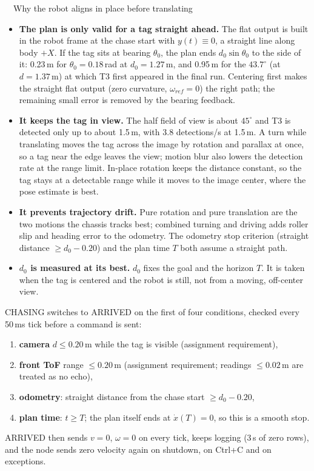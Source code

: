 \begin{keybox}{\faCompass\ \ Why the robot aligns in place before translating}
\small
\begin{itemize}
  \item \textbf{The plan is only valid for a tag straight ahead.} The flat output is built in the robot frame at the
        chase start with $y(t)\equiv0$, a straight line along body $+X$. If the tag sits at bearing $\theta_0$, the
        plan ends $d_0\sin\theta_0$ to the side of it: 0.23\,m for $\theta_0=0.18$\,rad at $d_0=1.27$\,m, and
        0.95\,m for the $43.7^\circ$ (at $d=1.37$\,m) at which T3 first appeared in the final run. Centering first makes the straight
        flat output (zero curvature, $\omega_{ref}=0$) the right path; the remaining small error is removed by the bearing
        feedback.
  \item \textbf{It keeps the tag in view.} The half field of view is about $45^\circ$ and T3 is detected only up to about
        1.5\,m, with 3.8 detections/s at 1.5\,m. A turn while translating moves the tag across the image by rotation
        and parallax at once, so a tag near the edge leaves the view; motion blur also lowers the detection rate at
        the range limit. In-place rotation keeps the distance constant, so the tag stays at a detectable range while
        it moves to the image center, where the pose estimate is best.
  \item \textbf{It prevents trajectory drift.} Pure rotation and pure translation are the two motions the chassis
        tracks best; combined turning and driving adds roller slip and heading error to the odometry. The odometry
        stop criterion (straight distance $\ge d_0-0.20$) and the plan time $T$ both assume a straight path.
  \item \textbf{$d_0$ is measured at its best.} $d_0$ fixes the goal and the horizon $T$. It is taken when the tag is
        centered and the robot is still, not from a moving, off-center view.
\end{itemize}
\end{keybox}

\label{sec:brake}
CHASING switches to ARRIVED on the first of four conditions, checked every 50\,ms tick before a command is sent:
\begin{enumerate}
  \item \textbf{camera} $d\le0.20$\,m while the tag is visible (assignment requirement),
  \item \textbf{front ToF} range $\le0.20$\,m (assignment requirement; readings $\le0.02$\,m are treated as no echo),
  \item \textbf{odometry}: straight distance from the chase start $\ge d_0-0.20$,
  \item \textbf{plan time}: $t\ge T$; the plan itself ends at $\dot x(T)=0$, so this is a smooth stop.
\end{enumerate}
ARRIVED then sends $v=0$, $\omega=0$ on every tick, keeps logging (3\,s of zero rows), and the node sends zero velocity
again on shutdown, on Ctrl+C and on exceptions.

